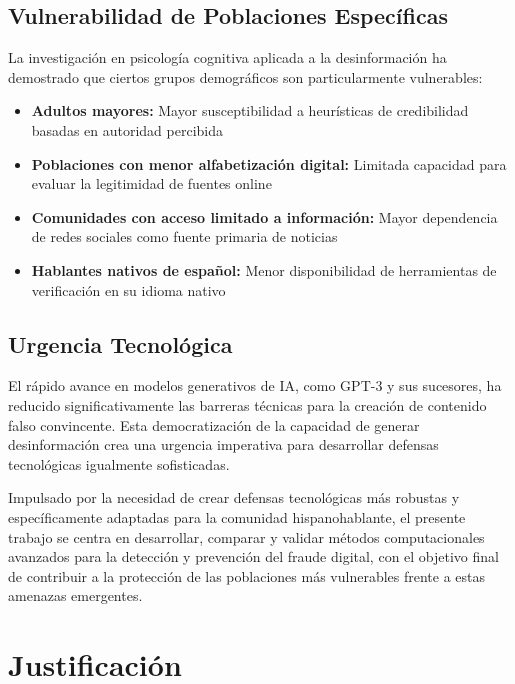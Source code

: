 \subsection{Vulnerabilidad de Poblaciones Específicas}

La investigación en psicología cognitiva aplicada a la desinformación \cite{ali2021fake} ha demostrado que ciertos grupos demográficos son particularmente vulnerables:

\begin{itemize}
    \item \textbf{Adultos mayores:} Mayor susceptibilidad a heurísticas de credibilidad basadas en autoridad percibida
    \item \textbf{Poblaciones con menor alfabetización digital:} Limitada capacidad para evaluar la legitimidad de fuentes online
    \item \textbf{Comunidades con acceso limitado a información:} Mayor dependencia de redes sociales como fuente primaria de noticias
    \item \textbf{Hablantes nativos de español:} Menor disponibilidad de herramientas de verificación en su idioma nativo
\end{itemize}

\subsection{Urgencia Tecnológica}

El rápido avance en modelos generativos de IA, como GPT-3 \cite{brown2020language} y sus sucesores, ha reducido significativamente las barreras técnicas para la creación de contenido falso convincente. Esta democratización de la capacidad de generar desinformación \cite{su2023fake} crea una urgencia imperativa para desarrollar defensas tecnológicas igualmente sofisticadas.

Impulsado por la necesidad de crear defensas tecnológicas más robustas y específicamente adaptadas para la comunidad hispanohablante, el presente trabajo se centra en desarrollar, comparar y validar métodos computacionales avanzados para la detección y prevención del fraude digital, con el objetivo final de contribuir a la protección de las poblaciones más vulnerables frente a estas amenazas emergentes.

\section{Justificación}

